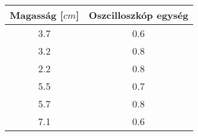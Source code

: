 \begin{center}
\begin{tabular}{|c|c|}
\hline
Magasság [$cm$] & Oszcilloszkóp egység \\
\hline
3.7 & 0.6 \\
\hline
3.2 & 0.8 \\
\hline
2.2 & 0.8 \\
\hline
5.5 & 0.7 \\
\hline
5.7 & 0.8 \\
\hline
7.1 & 0.6 \\
\hline
\end{tabular}
\end{center}